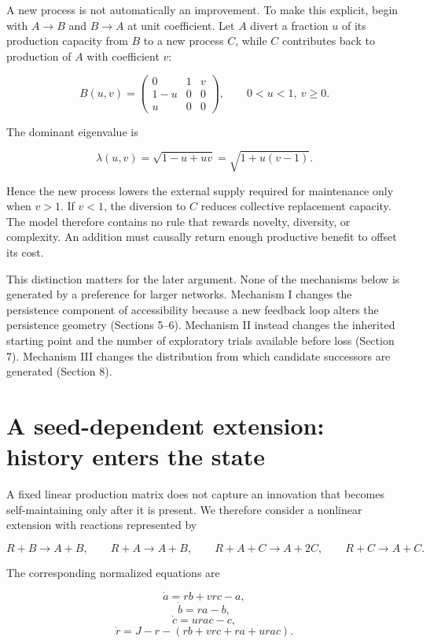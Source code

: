 \documentclass[11pt,a4paper]{article}
\begin{document}
A new process is not automatically an improvement. To make this
explicit, begin with \(A \to B\) and \(B \to A\) at unit coefficient.
Let \(A\) divert a fraction \(u\) of its production capacity from \(B\)
to a new process \(C\), while \(C\) contributes back to production of
\(A\) with coefficient \(v\):

\[
B(u,v) = \begin{pmatrix} 0 & 1 & v \\ 1-u & 0 & 0 \\ u & 0 & 0 \end{pmatrix}, \qquad 0 < u < 1,\ v \geq 0.
\]

The dominant eigenvalue is

\[
\lambda(u,v) = \sqrt{1-u+uv} = \sqrt{1+u(v-1)}.
\]

Hence the new process lowers the external supply required for
maintenance only when \(v > 1\). If \(v < 1\), the diversion to \(C\)
reduces collective replacement capacity. The model therefore contains no
rule that rewards novelty, diversity, or complexity. An addition must
causally return enough productive benefit to offset its cost.

This distinction matters for the later argument. None of the mechanisms
below is generated by a preference for larger networks. Mechanism I
changes the persistence component of accessibility because a new
feedback loop alters the persistence geometry (Sections 5--6). Mechanism
II instead changes the inherited starting point and the number of
exploratory trials available before loss (Section 7). Mechanism III
changes the distribution from which candidate successors are generated
(Section 8).

\section{A seed-dependent extension: history enters the
state}\label{a-seed-dependent-extension-history-enters-the-state}

A fixed linear production matrix does not capture an innovation that
becomes self-maintaining only after it is present. We therefore consider
a nonlinear extension with reactions represented by

\[
R + B \to A + B, \qquad R + A \to A + B, \qquad R + A + C \to A + 2C, \qquad R + C \to A + C.
\]

The corresponding normalized equations are

\[
\dot a = rb + vrc - a, \tag{8}
\] \[
\dot b = ra - b, \tag{9}
\] \[
\dot c = urac - c, \tag{10}
\] \[
\dot r = J - r - (rb + vrc + ra + urac). \tag{11}
\]
\end{document}
